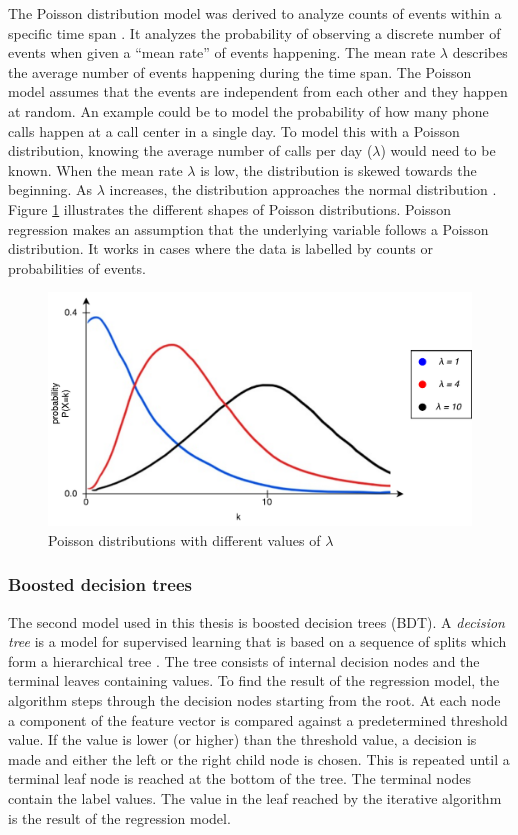 The Poisson distribution model was derived to analyze counts of events within a specific time span \cite{osgood2000poisson}.
It analyzes the probability of observing a discrete number of events when given a ``mean rate'' of events happening.
The mean rate $\lambda$ describes the average number of events happening during the time span.
The Poisson model assumes that the events are independent from each other and they happen at random.
An example could be to model the probability of how many phone calls happen at a call center in a single day.
To model this with a Poisson distribution, knowing the average number of calls per day ($\lambda$) would need to be known.
When the mean rate $\lambda$ is low, the distribution is skewed towards the beginning.
As $\lambda$ increases, the distribution approaches the normal distribution \cite{osgood2000poisson}.
Figure \ref{fig:poissongraphs} illustrates the different shapes of Poisson distributions.
Poisson regression makes an assumption that the underlying variable follows a Poisson distribution.
It works in cases where the data is labelled by counts or probabilities of events.

\begin{figure}[htb]
\centering \includegraphics[width=0.8\linewidth]{gfx/figures/poissons.pdf}
\caption{Poisson distributions with different values of $\lambda$}
\label{fig:poissongraphs}
\end{figure}

\subsubsection{Boosted decision trees}

The second model used in this thesis is boosted decision trees (BDT).
A \textit{decision tree} is a model for supervised learning that is based on a sequence of splits which form a hierarchical tree \cite{alpaydin}.
The tree consists of internal decision nodes and the terminal leaves containing values.
To find the result of the regression model, the algorithm steps through the decision nodes starting from the root.
At each node a component of the feature vector is compared against a predetermined threshold value.
If the value is lower (or higher) than the threshold value, a decision is made and either the left or the right child node is chosen.
This is repeated until a terminal leaf node is reached at the bottom of the tree. 
The terminal nodes contain the label values.
The value in the leaf reached by the iterative algorithm is the result of the regression model.

